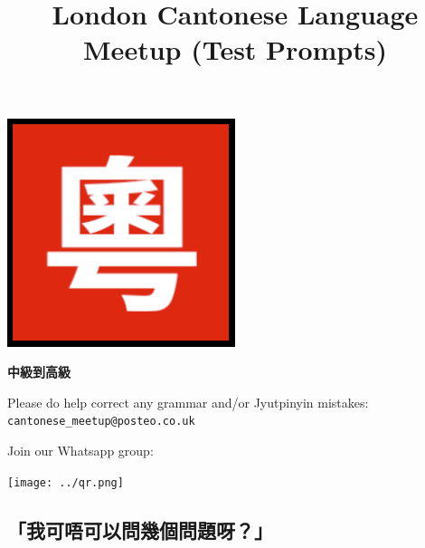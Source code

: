 \documentclass[12pt,a4paper]{leaflet}
\date{}
\title{London Cantonese Language Meetup (Test Prompts)}
\author{}
\begin{document}
\maketitle

\vspace{-2cm}

\begin{center}
\includegraphics[width=0.5\textwidth]{../logo.png}
\end{center}

\begin{center}
\textbf{\LARGE 中級到高級}
\end{center}

Please do help correct any grammar and/or Jyutpinyin mistakes: \texttt{cantonese\_meetup@posteo.co.uk}

Join our Whatsapp group:
\begin{center}
\texttt{[image: ../qr.png]}
\end{center}

\newpage

\begin{center}
\section*{「我可唔可以問幾個問題呀？」}
\end{center}
\end{document}
